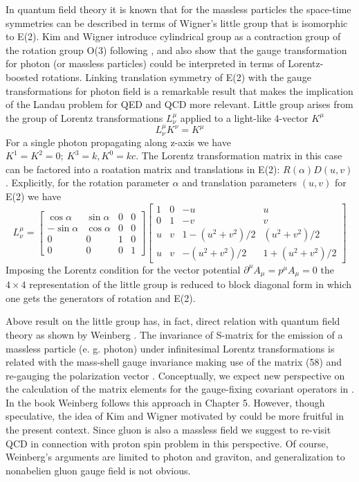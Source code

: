 \documentclass[aps, singlecolumn, showpacs]{revtex4-2}
\begin{document}
 In quantum field theory it is known that for the massless particles the space-time symmetries can be described in terms of Wigner's little group that is isomorphic to E(2). Kim and Wigner \cite{33} introduce cylindrical group as a contraction group of the rotation group O(3) following \cite{20}, and also show that the gauge transformation for photon (or massless particles) could be interpreted in terms of Lorentz-boosted rotations. Linking translation symmetry of E(2) with the gauge transformations for photon field is a remarkable result \cite{33} that makes the implication of the Landau problem for QED and QCD more relevant. Little group arises from the group of Lorentz transformations $L^\mu_\nu$ applied to a light-like 4-vector $K^\mu$
\begin{equation} 
L^\mu_\nu K^\nu = K^\mu
\end{equation}
For a single photon propagating along z-axis we have $K^1 =K^2 =0 ; ~K^3 =k, K^0 =k c$. The Lorentz transformation matrix in this case can be factored into a roatation matrix and translations in E(2): $R(\alpha) D(u,v)$. Explicitly, for the rotation parameter $\alpha$ and translation parameters $(u,v)$ for E(2) we have
\begin{equation}
L^\mu_\nu = \begin{bmatrix} \cos \alpha & \sin \alpha & 0 & 0 \\ -\sin \alpha & \cos \alpha & 0 & 0 \\ 0 & 0 & 1 & 0 \\ 0 & 0 & 0 & 1 \end{bmatrix} \begin{bmatrix} 1 & 0 & -u & u \\ 0 & 1 & -v & v \\ u & v & 1 -(u^2 +v^2)/2 & (u^2 +v^2)/2 \\  u & v & -(u^2 +v^2)/2 & 1 +(u^2 +v^2)/2 \end{bmatrix}
\end{equation}
Imposing the Lorentz condition for the vector potential $\partial^\mu A_\mu = p^\mu A_\mu =0$ the $4 \times 4$ representation of the little group is reduced to block diagonal form in which one gets the generators of rotation and E(2).

Above result on the little group has, in fact, direct relation with quantum field theory as shown by Weinberg \cite{34}. The invariance of S-matrix for the emission of a massless particle (e. g. photon) under infinitesimal Lorentz transformations is related with the mass-shell gauge invariance making use of the matrix (58) and re-gauging the polarization vector \cite{34}. Conceptually, we expect new perspective on the calculation of the matrix elements for the gauge-fixing covariant operators in \cite{11, 12, 13}. In the book \cite{23} Weinberg follows this approach in Chapter 5. However, though speculative, the idea of Kim and Wigner \cite{33} motivated by \cite{34} could be more fruitful in the present context. Since gluon is also a massless field we suggest to re-visit QCD in connection with proton spin problem in this perspective. Of course, Weinberg's arguments \cite{34} are limited to photon and graviton, and generalization to nonabelien gluon gauge field is not obvious.
\end{document}
